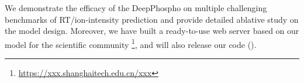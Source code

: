 We demonstrate the efficacy of the DeepPhospho on multiple challenging benchmarks of RT/ion-intensity prediction and provide detailed ablative study on the model design. Moreover, we have built a ready-to-use web server based on our model for the scientific community \footnote{\url{https://xxx.shanghaitech.edu.cn/xxx}}, and will also release our code ().



 

 


 


